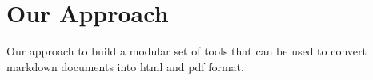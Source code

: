 \section{Our Approach}
Our approach to build a modular set of tools that can be used to convert markdown documents into html and pdf format.

